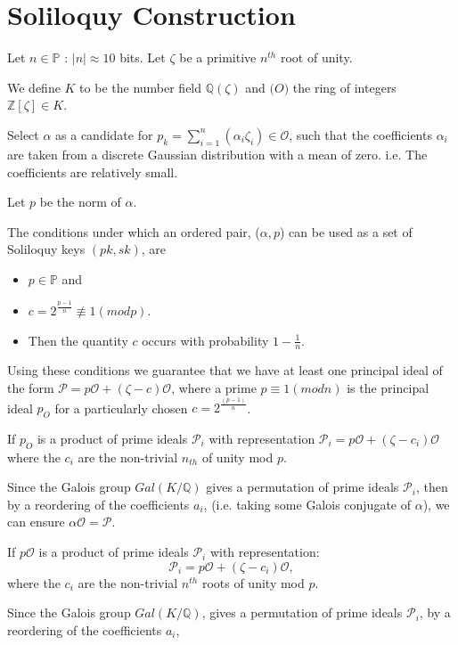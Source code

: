 \section{Soliloquy Construction}

Let $n \in \mathbb{P}$ : $|n| \approx 10$ bits.
Let $\zeta$ be a primitive $n^{th}$ root of unity.

We define $K$ to be the number field $\mathbb{Q}(\zeta)$ and $\mathcal(O)$ the ring of integers $\mathbb{Z} [\zeta ] \in K$. 

Select $\alpha$ as a candidate for $p_{k} = \sum_{i=1}^{n} (\alpha_{i} \zeta_{i}) \in \mathcal{O}$, such that the coefficients $\alpha_{i}$ are taken from a discrete Gaussian distribution with a mean of zero.  
i.e. The coefficients are relatively small. 

Let $p$ be the norm of $\alpha$.

The conditions under which an ordered pair, ($\alpha, p$) can be used as a set of Soliloquy keys $(pk, sk)$, are 
\begin{itemize}
\item $p \in \mathbb{P}$  and 
\item $c=2^{\frac{p-1}{n}} \not\equiv 1(mod p)$.
\item Then the quantity $c$ occurs with probability $1-\frac{1}{n}$. 
\end{itemize}

Using these conditions we guarantee that we have at least one principal ideal of the form  $\mathcal{P} = p \mathcal{O} + (\zeta-c) \mathcal{O}$, where a prime $p \equiv 1(mod n)$ is the principal ideal $p_{O}$  for a particularly chosen $c = 2^{\frac{(p-1)}{n}}$. 

If $p_{O}$ is a product of prime ideals $\mathcal{P}_{i}$ with representation $\mathcal{P}_{i} = p\mathcal{O} + (\zeta-c_{i}) \mathcal{O}$ where the $c_{i}$ are the non-trivial $n_{th}$ of unity mod $p$. 

Since the Galois group $Gal(K/\mathbb{Q})$ gives a permutation of prime ideals $\mathcal{P}_{i}$, then by a reordering of the coefficients $a_{i}$, (i.e. taking some Galois conjugate of $\alpha$), we can ensure $\alpha \mathcal{O} = \mathcal{P}$. 

If $p \mathcal{O}$ is a product of prime ideals $\mathcal{P}_{i}$ with representation:  
\[\mathcal{P}_{i} = p\mathcal{O} + (\zeta-c_{i}) \mathcal{O},\]
 where the $c_{i}$ are the non-trivial $n^{th}$ roots of unity mod $p$. 
  
Since the Galois group $Gal(K/ \mathbb{Q})$, gives a permutation of prime ideals $\mathcal{P}_{i}$, by a reordering of the coefficients $a_{i}$, 

